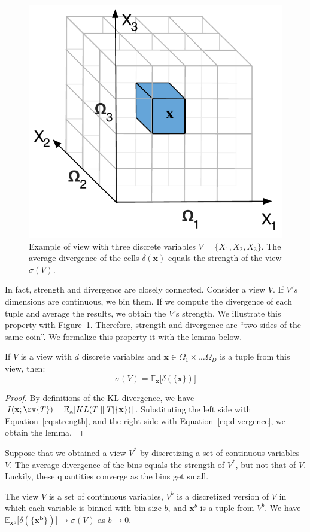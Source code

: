 \begin{figure}[t!]
\centering
\includegraphics[width=0.6\columnwidth]{images/3Dtest}
\caption{Example of view with three discrete variables $V = \{X_1, X_2, X_3\}$.
The average divergence of the cells $\delta(\mathbf{x})$ equals the strength of
the view  $\sigma(V)$.}
\label{fig:binningexample}
\end{figure}
In fact, strength and divergence are closely connected.  Consider a view $V$.
If $V's$ dimensions are continuous, we bin them. If we compute the divergence
of each tuple and average the results, we obtain the $V$'s strength. We illustrate
this property with Figure~\ref{fig:binningexample}.  Therefore, strength and
divergence are ``two sides of the same coin''. We formalize this property it
with the lemma below.
\begin{lemma}
    If $V$ is a view with $d$ discrete variables and $\mathbf{x} \in \Omega_1
    \times \ldots \Omega_D$ is a tuple from this view, then:
    \begin{equation}\label{eq:coin}
        \sigma(V) = \mathbb{E}_{\mathbf{x}}  \big[ \delta(\{\mathbf{x}\}) \big]
    \end{equation}
\end{lemma}
\begin{proof}
    By definitions of the KL divergence, we have 
    $I(\mathbf{x} ; \rv{T})= \mathbb{E}_{\mathbf{x}}[ KL( T \parallel T |
    \{\mathbf{x}\} )]$.
    Substituting the left side with Equation~\ref{eq:strength}, and the right
    side with Equation~\ref{eq:divergence}, we obtain the lemma.
\end{proof}
Suppose that we obtained a view $V^*$ by discretizing a set of continuous
variables $V$. The average divergence of the bins equals the strength of $V^*$,
but not that of $V$. Luckily, these quantities converge as the bins get small.
\begin{lemma}
    The view $V$ is a set of continuous variables, $V^b$ is a discretized
    version of $V$ in which each variable is binned with bin size $b$, and
    $\mathbf{x}^b$ is a tuple from $V^b$. We have $\mathbb{E}_{\mathbf{x^b}}
    \big[ \delta(\{\mathbf{x^b}\}) \big] \to  \sigma(V)$ as $b \to 0$.
\end{lemma}
